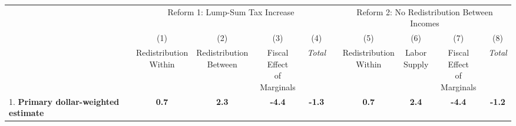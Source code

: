 \begin{tabular*}{1.38\textwidth}{@{\extracolsep{\fill}}lccccccccc}
  \toprule
  \addlinespace
                     & \multicolumn{4}{c}{Reform 1: Lump-Sum Tax
    Increase}                                  & \multicolumn{1}{l}{}
  & \multicolumn{4}{c}{Reform 2: No  Redistribution Between Incomes}
  \\
\multicolumn{1}{c}{} & (1)                   & (2)                    & (3)                      & (4)            &                      & (5)                   & (6)          & (7)                      & (8)            \\
                     & \shortstack{Redistribution \\ Within} &
\shortstack{Redistribution \\ Between} & \shortstack{Fiscal Effect \\ of
  Marginals} & \textit{Total} &                      &
\shortstack{Redistribution \\ Within} & \shortstack{Labor \\ Supply} &
\shortstack{Fiscal Effect \\ of Marginals} & \textit{Total} \\
\cline{2-5} \cline{7-10}
1. \textbf{Primary dollar-weighted estimate} & \textbf{0.7}        & \textbf{2.3}         & \textbf{-4.4}             & \textbf{-1.3}  &                      & \textbf{0.7}        & \textbf{2.4} & \textbf{-4.4}             & \textbf{-1.2}  \\


\end{tabular*}
